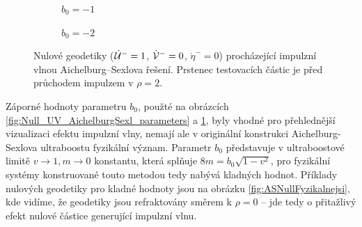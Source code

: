 \begin{figure}[ht]
    \centering
    \begin{subfigure}[b]{0.45\textwidth}
        \caption{$b_0 = -1$}
    \end{subfigure}
    \hfill
    \begin{subfigure}[b]{0.45\textwidth}
        \caption{$b_0 = -2$}
    \end{subfigure}
    \caption{Nulové geodetiky ($\dot {\mathcal{U}}^-=1$, $\dot {\mathcal{V}}^-=0$, $\dot \eta^-=0$) procházející impulzní vlnou Aichelburg--Sexlova řešení. Prstenec testovacích částic je před průchodem impulzem v $\rho=2$.}
    \label{fig:NullASRing01}
\end{figure}

Záporné hodnoty parametru $b_0$, použté na obrázcích \ref{fig:Null_UV_AichelburgSexl_parameters} a \ref{fig:NullASRing01}, byly vhodné pro přehlednější vizualizaci
efektu impulzní vlny, nemají ale v originální konstrukci Aichelburg-Sexlova ultraboostu fyzikální význam. Parametr $b_0$
představuje v ultraboostové limitě $v \to 1, m \to 0$ konstantu, která splňuje $8m = b_0\sqrt{1-v^2}$, pro fyzikální systémy konstruované touto metodou
tedy nabývá kladných hodnot. Příklady nulových geodetiky pro kladné hodnoty jsou na obrázku \ref{fig:ASNullFyzikalnejsi}, kde vidíme,
že geodetiky jsou refraktovány směrem k $\rho=0$ -- jde tedy o přitažlivý efekt nulové částice generující impulzní vlnu.

